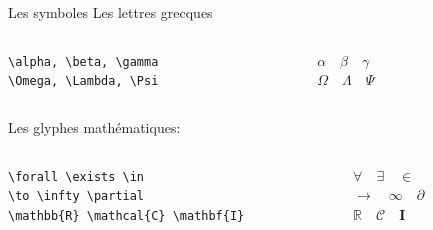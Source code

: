 \documentclass[handout]{beamer}
\begin{document}
\begin{frame}[fragile]{Les symboles}
Les lettres grecques\\[11pt]

\begin{columns}
	\begin{column}{0.5\textwidth}
		\verb|\alpha, \beta, \gamma|\\
		\verb|\Omega, \Lambda, \Psi|
	\end{column}
	\begin{column}{0.5\textwidth}
		$\alpha \quad \beta \quad \gamma$\\
		$\Omega \quad \Lambda \quad \Psi$\\[11pt]
	\end{column}
\end{columns}
\vfill
Les glyphes mathématiques:\\[11pt]
\begin{columns}
	\begin{column}{0.5\textwidth}
		\verb|\forall \exists \in|\\
		\verb|\to \infty \partial|\\
		\verb|\mathbb{R} \mathcal{C} \mathbf{I}|
	\end{column}
	\begin{column}{0.5\textwidth}
		\begin{center}
			$\forall \quad \exists \quad \in$\\
			$\to \quad \infty \quad \partial$\\
			$\mathbb{R} \quad \mathcal{C} \quad \mathbf{I}$
		\end{center}
		
	\end{column}
\end{columns}
\end{frame}
\end{document}
